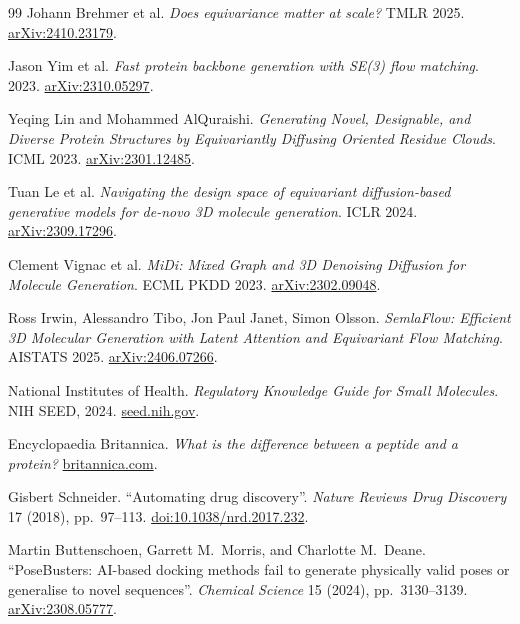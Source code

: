 \documentclass[12pt,a4paper,twoside]{report}
\begin{document}
\begin{thebibliography}{99}
Johann Brehmer et al.
\textit{Does equivariance matter at scale?} TMLR 2025.
\href{https://arxiv.org/abs/2410.23179}{arXiv:2410.23179}.

Jason Yim et al.
\textit{Fast protein backbone generation with SE(3) flow matching}. 2023.
\href{https://arxiv.org/abs/2310.05297}{arXiv:2310.05297}.

Yeqing Lin and Mohammed AlQuraishi.
\textit{Generating Novel, Designable, and Diverse Protein Structures by Equivariantly Diffusing Oriented Residue Clouds}. ICML 2023.
\href{https://arxiv.org/abs/2301.12485}{arXiv:2301.12485}.

Tuan Le et al.
\textit{Navigating the design space of equivariant diffusion-based generative models for de-novo 3D molecule generation}. ICLR 2024.
\href{https://arxiv.org/abs/2309.17296}{arXiv:2309.17296}.

Clement Vignac et al.
\textit{MiDi: Mixed Graph and 3D Denoising Diffusion for Molecule Generation}. ECML PKDD 2023.
\href{https://arxiv.org/abs/2302.09048}{arXiv:2302.09048}.

Ross Irwin, Alessandro Tibo, Jon Paul Janet, Simon Olsson.
\textit{SemlaFlow: Efficient 3D Molecular Generation with Latent Attention and Equivariant Flow Matching}. AISTATS 2025.
\href{https://arxiv.org/abs/2406.07266}{arXiv:2406.07266}.

National Institutes of Health.
\textit{Regulatory Knowledge Guide for Small Molecules}. NIH SEED, 2024.
\href{https://seed.nih.gov/sites/default/files/2024-03/Regulatory-Knowledge-Guide-for-Small-Molecules.pdf}{seed.nih.gov}.

Encyclopaedia Britannica.
\textit{What is the difference between a peptide and a protein?}
\href{https://www.britannica.com/story/what-is-the-difference-between-a-peptide-and-a-protein}{britannica.com}.

Gisbert Schneider.
``Automating drug discovery''.
\textit{Nature Reviews Drug Discovery} 17 (2018), pp.~97--113.
\href{https://doi.org/10.1038/nrd.2017.232}{doi:10.1038/nrd.2017.232}.

Martin Buttenschoen, Garrett M.~Morris, and Charlotte M.~Deane.
``PoseBusters: AI-based docking methods fail to generate physically valid poses or generalise to novel sequences''.
\textit{Chemical Science} 15 (2024), pp.~3130--3139.
\href{https://arxiv.org/abs/2308.05777}{arXiv:2308.05777}.


\end{thebibliography}
\end{document}
